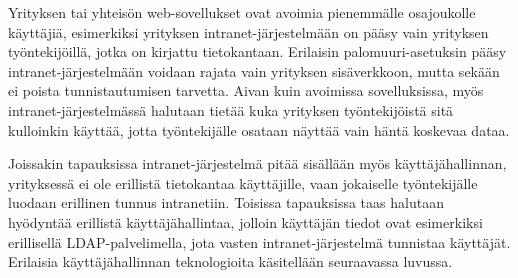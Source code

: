 Yrityksen tai yhteisön web-sovellukset ovat avoimia pienemmälle osajoukolle käyttäjiä, esimerkiksi yrityksen intranet-järjestelmään on pääsy vain yrityksen työntekijöillä, jotka on kirjattu tietokantaan. Erilaisin palomuuri-asetuksin pääsy intranet-järjestelmään voidaan rajata vain yrityksen sisäverkkoon, mutta sekään ei poista tunnistautumisen tarvetta. Aivan kuin avoimissa sovelluksissa, myös intranet-järjestelmässä halutaan tietää kuka yrityksen työntekijöistä sitä kulloinkin käyttää, jotta työntekijälle osataan näyttää vain häntä koskevaa dataa.

Joissakin tapauksissa intranet-järjestelmä pitää sisällään myös käyttäjähallinnan, yrityksessä ei ole erillistä tietokantaa käyttäjille, vaan jokaiselle työntekijälle luodaan erillinen tunnus intranetiin. Toisissa tapauksissa taas halutaan hyödyntää erillistä käyttäjähallintaa, jolloin käyttäjän tiedot ovat  esimerkiksi erillisellä LDAP-palvelimella, jota vasten intranet-järjestelmä tunnistaa käyttäjät. Erilaisia käyttäjähallinnan teknologioita käsitellään seuraavassa luvussa.